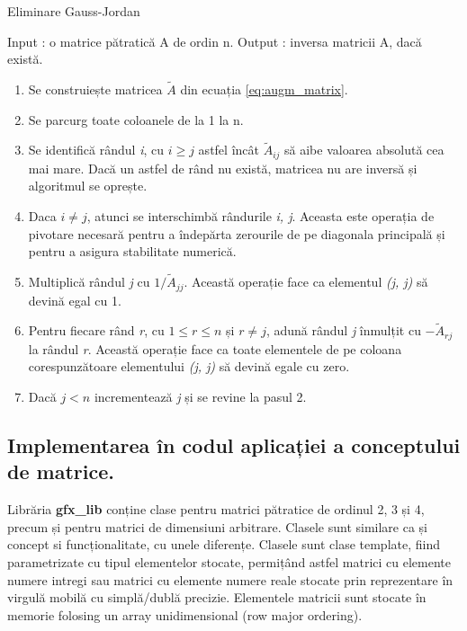 \begin{algorithm}
\caption{Eliminare Gauss-Jordan}
\label{alg:gauss_jordan_elim}
\begin{algorithmic}
\STATE Input : o matrice pătratică A de ordin n.
\STATE Output : inversa matricii A, dacă există.
\begin{enumerate}[{Pas} 1.]
  \item Se construiește matricea $\tilde{A}$ din ecuația \eqref{eq:augm_matrix}.
  \item Se parcurg toate coloanele de la 1 la n.
  \item Se identifică rândul \textit{i}, cu $\mathit{i \geq j}$ astfel încât
  $\tilde{A}_{ij}$ să aibe valoarea absolută cea mai mare. Dacă un astfel de
  rând nu există, matricea nu are inversă și algoritmul se oprește.
  \item Daca $\mathit{i \neq j}$, atunci se interschimbă rândurile 
  \textit{i, j}. Aceasta este operația de pivotare necesară pentru a îndepărta
  zerourile de pe diagonala principală și pentru a asigura stabilitate numerică.
  \item Multiplică rândul \textit{j} cu $1 \text{/} \tilde{A}_{jj}$. Această
  operație face ca elementul \textit{(j, j)} să devină egal cu 1.
  \item Pentru fiecare rând \textit{r}, cu $\mathit{1 \leq r \leq n}$ și $r
  \neq j$, adună rândul \textit{j} înmulțit cu $-\tilde{A}_{rj}$ la rândul
  \textit{r}. Această operație face ca toate elementele de pe coloana
  corespunzătoare elementului \textit{(j, j)} să devină egale cu zero.
  \item Dacă $\mathit{j < n}$ incrementează \textit{j} și se revine la pasul 2.
\end{enumerate}
\end{algorithmic}
\end{algorithm}

\subsection{Implementarea în codul aplicației a conceptului de matrice.}
\label{ch1:sec_matrix:sub_matrix_appcode}
\indent

Librăria \textbf{gfx\_lib} conține clase pentru matrici pătratice de ordinul 2,
3 și 4, precum și pentru matrici de dimensiuni arbitrare. Clasele sunt
similare ca și concept si funcționalitate, cu unele diferențe. 
Clasele sunt clase template, fiind parametrizate cu tipul elementelor stocate,
permițând astfel matrici cu elemente numere intregi sau matrici cu elemente
numere reale stocate prin reprezentare în virgulă mobilă cu simplă/dublă
precizie. Elementele matricii sunt stocate în memorie folosing un array
unidimensional (row major ordering).

